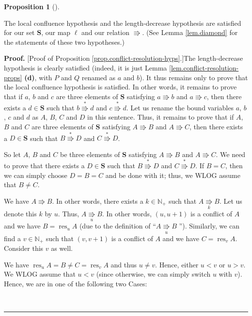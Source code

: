 \documentclass[numbers=enddot,12pt,final,onecolumn,notitlepage]{scrartcl}%
\theoremstyle{definition}
\newtheorem{prop}[theo]{Proposition}
\newenvironment{proposition}[1][]
{\begin{prop}[#1]\begin{leftbar}}
{\end{leftbar}\end{prop}}
\newenvironment{proof}[1][Proof]{\noindent\textbf{#1.} }{\ \rule{0.5em}{0.5em}}
\newenvironment{vershort}{}{}
\begin{document}
\begin{proposition}
\label{prop.conflict-resolution-hyps}The local confluence hypothesis and the
length-decrease hypothesis are satisfied for our set $\mathbf{S}$, our map
$\ell$ and our relation $\Rrightarrow$. (See Lemma \ref{lem.diamond} for the
statements of these two hypotheses.)
\end{proposition}

\begin{vershort}
\begin{proof}
[Proof of Proposition \ref{prop.conflict-resolution-hyps}.]The length-decrease
hypothesis is clearly satisfied (indeed, it is just Lemma
\ref{lem.conflict-resolution-props} \textbf{(d)}, with $P$ and $Q$ renamed as
$a$ and $b$). It thus remains only to prove that the local confluence
hypothesis is satisfied. In other words, it remains to prove that if $a$, $b$
and $c$ are three elements of $\mathbf{S}$ satisfying $a\Rrightarrow b$ and
$a\Rrightarrow c$, then there exists a $d\in\mathbf{S}$ such that
$b\overset{\ast}{\Rrightarrow}d$ and $c\overset{\ast}{\Rrightarrow}d$. Let us
rename the bound variables $a$, $b$, $c$ and $d$ as $A$, $B$, $C$ and $D$ in
this sentence. Thus, it remains to prove that if $A$, $B$ and $C$ are three
elements of $\mathbf{S}$ satisfying $A\Rrightarrow B$ and $A\Rrightarrow C$,
then there exists a $D\in\mathbf{S}$ such that $B\overset{\ast}{\Rrightarrow
}D$ and $C\overset{\ast}{\Rrightarrow}D$.

So let $A$, $B$ and $C$ be three elements of $\mathbf{S}$ satisfying
$A\Rrightarrow B$ and $A\Rrightarrow C$. We need to prove that there exists a
$D\in\mathbf{S}$ such that $B\overset{\ast}{\Rrightarrow}D$ and
$C\overset{\ast}{\Rrightarrow}D$. If $B=C$, then we can simply choose $D=B=C$
and be done with it; thus, we WLOG assume that $B\neq C$.

We have $A\Rrightarrow B$. In other words, there exists a $k\in\mathbb{N}_{+}$
such that $A\underset{k}{\Rrightarrow}B$. Let us denote this $k$ by $u$. Thus,
$A\underset{u}{\Rrightarrow}B$. In other words, $\left(  u,u+1\right)  $ is a
conflict of $A$ and we have $B=\operatorname*{res}\nolimits_{u}A$ (due to the
definition of \textquotedblleft$A\underset{u}{\Rrightarrow}B$%
\textquotedblright). Similarly, we can find a $v\in\mathbb{N}_{+}$ such that
$\left(  v,v+1\right)  $ is a conflict of $A$ and we have
$C=\operatorname*{res}\nolimits_{v}A$. Consider this $v$ as well.

We have $\operatorname*{res}\nolimits_{u}A=B\neq C=\operatorname*{res}%
\nolimits_{v}A$ and thus $u\neq v$. Hence, either $u<v$ or $u>v$. We WLOG
assume that $u<v$ (since otherwise, we can simply switch $u$ with $v$). Hence,
we are in one of the following two Cases:


\end{proof}
\end{vershort}
\end{document}
